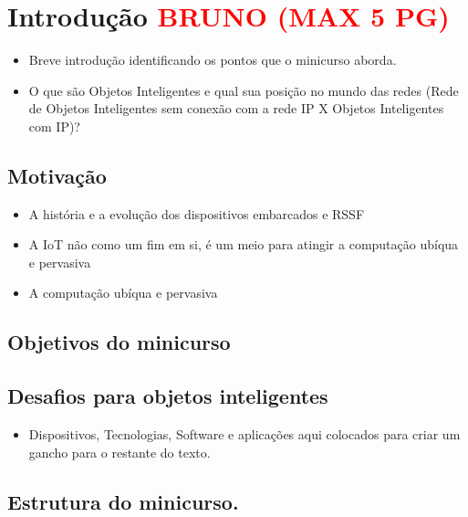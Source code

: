 
\section{Introdução \textcolor{red}{BRUNO (MAX 5 PG)}}
\label{sec:introducao}

  \begin{itemize}
    \item Breve introdução identificando os pontos que o minicurso aborda.
    \item O que são Objetos Inteligentes e qual sua posição no mundo das 
redes (Rede de Objetos Inteligentes  sem conexão com a rede IP X Objetos 
Inteligentes com IP)?
  \end{itemize}

  \subsection{Motivação}
    \begin{itemize}
      \item A história e a evolução dos dispositivos embarcados e RSSF
      \item A IoT não como um fim em si, é um meio para atingir a 
computação ubíqua e pervasiva
      \item A computação ubíqua e pervasiva
    \end{itemize}
  \subsection{Objetivos do minicurso}
  
  \subsection{Desafios para objetos inteligentes}
    \begin{itemize}
      \item Dispositivos, Tecnologias, Software e aplicações aqui colocados 
para criar um gancho para o restante do texto.
    \end{itemize}
    
  \subsection{Estrutura do minicurso.}
